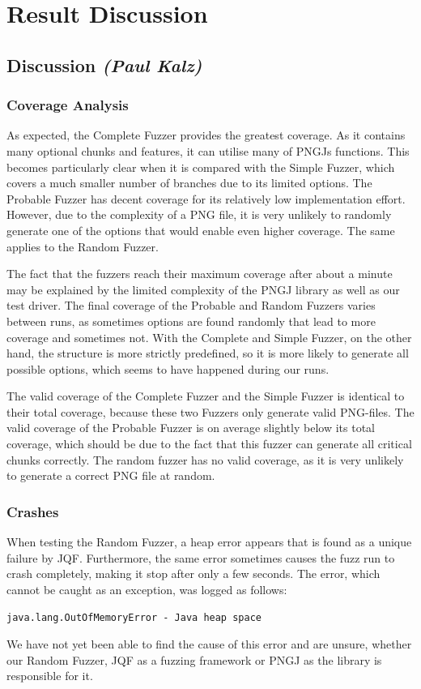 \documentclass[runningheads]{llncs}
\begin{document}
\section{Result Discussion}
\subsection{Discussion \normalfont\textit{(Paul Kalz)}}
\subsubsection{Coverage Analysis}
As expected, the Complete Fuzzer provides the greatest coverage. As it contains many optional chunks and features, it can utilise many of PNGJs functions. This becomes particularly clear when it is compared with the Simple Fuzzer, which covers a much smaller number of branches due to its limited options. The Probable Fuzzer has decent coverage for its relatively low implementation effort. However, due to the complexity of a PNG file, it is very unlikely to randomly generate one of the options that would enable even higher coverage. The same applies to the Random Fuzzer.

The fact that the fuzzers reach their maximum coverage after about a minute may be explained by the limited complexity of the PNGJ library as well as our test driver. The final coverage of the Probable and Random Fuzzers varies between runs, as sometimes options are found randomly that lead to more coverage and sometimes not. With the Complete and Simple Fuzzer, on the other hand, the structure is more strictly predefined, so it is more likely to generate all possible options, which seems to have happened during our runs.

The valid coverage of the Complete Fuzzer and the Simple Fuzzer is identical to their total coverage, because these two Fuzzers only generate valid PNG-files. The valid coverage of the Probable Fuzzer is on average slightly below its total coverage, which should be due to the fact that this fuzzer can generate all critical chunks correctly. The random fuzzer has no valid coverage, as it is very unlikely to generate a correct PNG file at random.

\subsubsection{Crashes}
\label{crashes}
When testing the Random Fuzzer, a heap error appears that is found as a unique failure by JQF. Furthermore, the same error sometimes causes the fuzz run to crash completely, making it stop after only a few seconds.
The error, which cannot be caught as an exception, was logged as follows:
\begin{center}
    \texttt{java.lang.OutOfMemoryError - Java heap space}    
\end{center}
We have not yet been able to find the cause of this error and are unsure, whether our Random Fuzzer, JQF as a fuzzing framework or PNGJ as the library is responsible for it.
\end{document}
